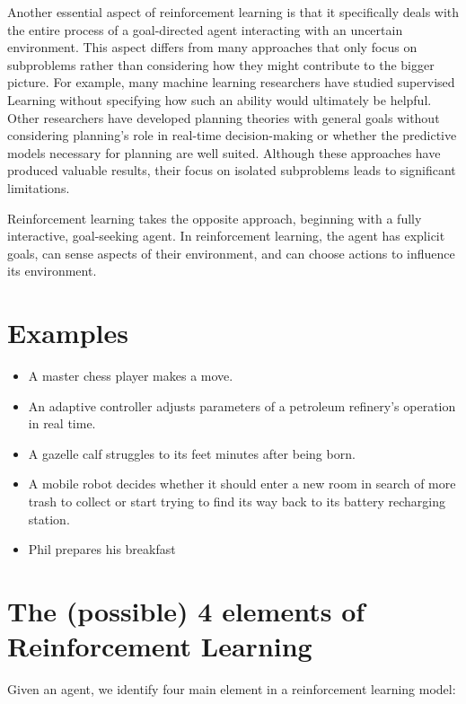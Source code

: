 \documentclass[
  letterpaper,
  DIV=11,
  numbers=noendperiod]{scrreprt}
\theoremstyle{definition}
\theoremstyle{remark}
\begin{document}
Another essential aspect of reinforcement learning is that it
specifically deals with the entire process of a goal-directed agent
interacting with an uncertain environment. This aspect differs from many
approaches that only focus on subproblems rather than considering how
they might contribute to the bigger picture. For example, many machine
learning researchers have studied supervised Learning without specifying
how such an ability would ultimately be helpful. Other researchers have
developed planning theories with general goals without considering
planning's role in real-time decision-making or whether the predictive
models necessary for planning are well suited. Although these approaches
have produced valuable results, their focus on isolated subproblems
leads to significant limitations.

Reinforcement learning takes the opposite approach, beginning with a
fully interactive, goal-seeking agent. In reinforcement learning, the
agent has explicit goals, can sense aspects of their environment, and
can choose actions to influence its environment.

\section{Examples}\label{examples}

\begin{itemize}
\item
  A master chess player makes a move.
\item
  An adaptive controller adjusts parameters of a petroleum refinery's
  operation in real time.
\item
  A gazelle calf struggles to its feet minutes after being born.
\item
  A mobile robot decides whether it should enter a new room in search of
  more trash to collect or start trying to find its way back to its
  battery recharging station.
\item
  Phil prepares his breakfast
\end{itemize}

\section{The (possible) 4 elements of Reinforcement
Learning}\label{the-possible-4-elements-of-reinforcement-learning}

Given an agent, we identify four main element in a reinforcement
learning model:
\end{document}
